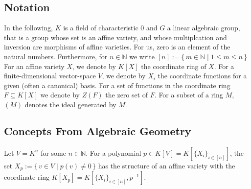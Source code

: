 \subsection{Notation}

In the following, $K$ is a field of characteristic $0$ and $G$ a linear algebraic group, that is a group whose set is an affine variety, and whose multiplcation and inversion are morphisms of affine varieties.
For us, zero is an element of the natural numbers.
Furthermore, for $n \in \mathbb{N}$ we write $[n] := \{\, m \in \mathbb{N} \mid 1 \leq m \leq n \,\}$
For an affine variety $X$, we denote by $K[X]$ the coordinate ring of $X$.
For a finite-dimensional vector-space $V$, we denote by $X_i$ the coordinate functions for a given (often a canonical) basis.
For a set of functions in the coordinate ring $F \subseteq K[X]$ we denote by $Z(F)$ the zero set of $F$. %
For a subset of a ring $M$, $(M)$ denotes the ideal generated by $M$.

\subsection{Concepts From Algebraic Geometry}

\begin{proposition}\label{rabbi}
  Let $V = K^n$ for some $n \in \mathbb{N}$.
  For a polynomial $p \in K[V] = K[\{X_i\}_{i\in[n]}]$, the set $ X_p := \{\, v \in V \mid p(v) \neq 0 \,\}$ has the structure of an affine variety with the coordinate ring $K[X_p] = K[\{X_i\}_{i \in [n]}, p^{-1}]$.
\end{proposition}

